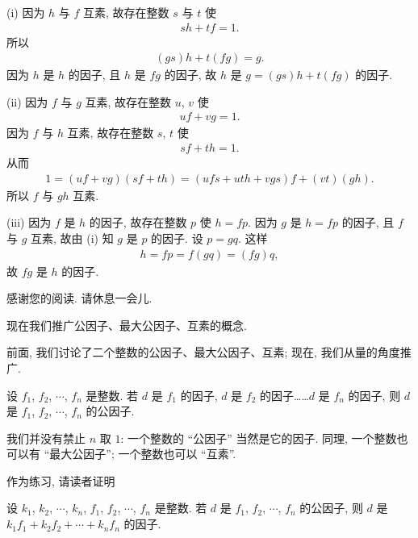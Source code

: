 \begin{pf}
    (i) 因为 $h$ 与 $f$ 互素, 故存在整数 $s$ 与 $t$ 使
    \begin{align*}
        sh + tf = 1.
    \end{align*}
    所以
    \begin{align*}
        (gs)h + t(fg) = g.
    \end{align*}
    因为 $h$ 是 $h$ 的因子, 且 $h$ 是 $fg$ 的因子, 故 $h$ 是 $g = (gs)h + t(fg)$ 的因子.

    (ii) 因为 $f$ 与 $g$ 互素, 故存在整数 $u$, $v$ 使
    \begin{align*}
        uf + vg = 1.
    \end{align*}
    因为 $f$ 与 $h$ 互素, 故存在整数 $s$, $t$ 使
    \begin{align*}
        sf + th = 1.
    \end{align*}
    从而
    \begin{align*}
        1 = (uf + vg)(sf + th) = (ufs + uth + vgs)f + (vt)(gh).
    \end{align*}
    所以 $f$ 与 $gh$ 互素.

    (iii) 因为 $f$ 是 $h$ 的因子, 故存在整数 $p$ 使 $h = fp$. 因为 $g$ 是 $h = fp$ 的因子, 且 $f$ 与 $g$ 互素, 故由 (i) 知 $g$ 是 $p$ 的因子. 设 $p = gq$. 这样
    \begin{align*}
        h = fp = f(gq) = (fg)q,
    \end{align*}
    故 $fg$ 是 $h$ 的因子.
\end{pf}

感谢您的阅读. 请休息一会儿.

\myLine

现在我们推广公因子、最大公因子、互素的概念.

前面, 我们讨论了二个整数的公因子、最大公因子、互素; 现在, 我们从量的角度推广.

\begin{definition}
    设 $f_1$, $f_2$, $\cdots$, $f_n$ 是整数. 若 $d$ 是 $f_1$ 的因子, $d$ 是 $f_2$ 的因子……$d$ 是 $f_n$ 的因子, 则 $d$ 是 $f_1$, $f_2$, $\cdots$, $f_n$ 的公因子.
\end{definition}

\begin{remark}
    我们并没有禁止 $n$ 取 $1$: 一个整数的 ``公因子'' 当然是它的因子. 同理, 一个整数也可以有 ``最大公因子''; 一个整数也可以 ``互素''.
\end{remark}

作为练习, 请读者证明
\begin{proposition}
    设 $k_1$, $k_2$, $\cdots$, $k_n$, $f_1$, $f_2$, $\cdots$, $f_n$ 是整数. 若 $d$ 是 $f_1$, $f_2$, $\cdots$, $f_n$ 的公因子, 则 $d$ 是 $k_1 f_1 + k_2 f_2 + \cdots + k_n f_n$ 的因子.
\end{proposition}

